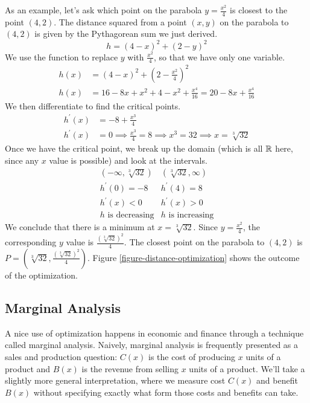 \documentclass[fleqn]{report}
\begin{document}
\begin{example}
As an example, let's ask which point on the parabola $y =
\frac{x^2}{4}$ is closest to the point $(4,2)$.  The distance
squared from a  point $(x,y)$ on the parabola to $(4,2)$ is
given by the Pythagorean sum we just derived.
\begin{equation*}
h = (4-x)^2 + (2-y)^2
\end{equation*}
We use the function to replace $y$ with $\frac{x^2}{4}$, so
that we have only one variable.
\begin{align*}
h(x) & = (4-x)^2 + \left(2-\frac{x^2}{4} \right)^2 \\
h(x) & = 16 - 8x + x^2 + 4 - x^2 + \frac{x^4}{16} 
= 20 - 8x + \frac{x^4}{16} 
\end{align*}
We then differentiate to find the critical points.
\begin{align*}
h^\prime(x) & = -8 + \frac{x^3}{4} \\
h^\prime(x) & = 0 \implies \frac{x^3}{4} = 8 \implies 
x^3 = 32 \implies x = \sqrt[3]{32}
\end{align*}
Once we have the critical point, we break up the domain (which
is all $\mathbb{R}$ here, since any $x$ value is possible) and look
at the intervals.
\begin{displaymath}
\begin{array}{cc}
\left(-\infty, \sqrt[3]{32} \right) & \left( \sqrt[3]{32},
\infty \right) \\[1em]
h^\prime(0) = -8 & h^\prime(4) = 8 \\[1em]
h^\prime(x) < 0 & h^\prime(x) > 0 \\[1em]
h \text{ is decreasing} & h \text{ is increasing}
\end{array}
\end{displaymath}
We conclude that there is a minimum at $x=\sqrt[3]{32}$.
Since $y = \frac{x^2}{4}$, the corresponding $y$ value is
$\frac{(\sqrt[3]{32})^2}{4}$.  The closest point on the
parabola to $(4,2)$ is $P = \left( \sqrt[3]{32},
\frac{(\sqrt[3]{32})^2}{4} \right)$. Figure
\ref{figure-distance-optimization} shows the outcome of the
optimization.
\end{example}

\subsection{Marginal Analysis}
\label{marginal-analysis}

A nice use of optimization happens in economic and finance
through a technique called marginal analysis.  Naively,
marginal analysis is frequently presented as a sales and
production question: $C(x)$ is the cost of producing $x$ units
of a product and $B(x)$ is the revenue from selling $x$ units
of a product. We'll take a slightly more general
interpretation, where we measure cost $C(x)$ and benefit
$B(x)$ without specifying exactly what form those costs and
benefits can take.
\end{document}
